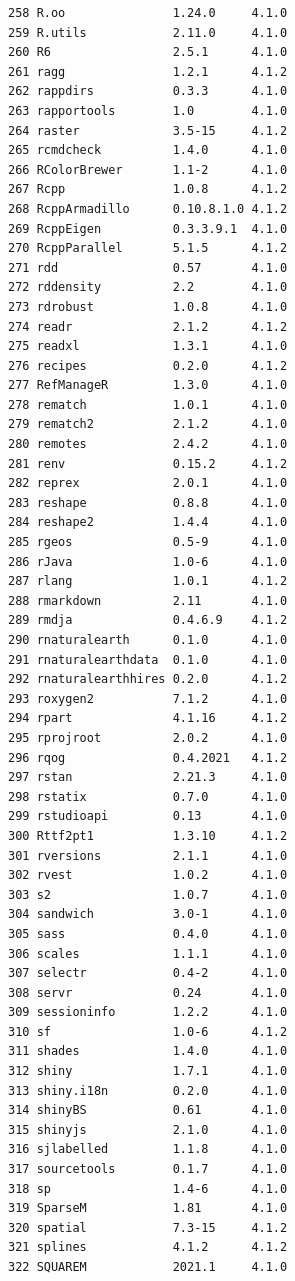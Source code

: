 \documentclass[
  a4paper,
  pandoc,
  ja=standard,
  jafont=haranoaji]{bxjsbook}
\begin{document}
\begin{verbatim}
258 R.oo               1.24.0     4.1.0
259 R.utils            2.11.0     4.1.0
260 R6                 2.5.1      4.1.0
261 ragg               1.2.1      4.1.2
262 rappdirs           0.3.3      4.1.0
263 rapportools        1.0        4.1.0
264 raster             3.5-15     4.1.2
265 rcmdcheck          1.4.0      4.1.0
266 RColorBrewer       1.1-2      4.1.0
267 Rcpp               1.0.8      4.1.2
268 RcppArmadillo      0.10.8.1.0 4.1.2
269 RcppEigen          0.3.3.9.1  4.1.0
270 RcppParallel       5.1.5      4.1.2
271 rdd                0.57       4.1.0
272 rddensity          2.2        4.1.0
273 rdrobust           1.0.8      4.1.0
274 readr              2.1.2      4.1.2
275 readxl             1.3.1      4.1.0
276 recipes            0.2.0      4.1.2
277 RefManageR         1.3.0      4.1.0
278 rematch            1.0.1      4.1.0
279 rematch2           2.1.2      4.1.0
280 remotes            2.4.2      4.1.0
281 renv               0.15.2     4.1.2
282 reprex             2.0.1      4.1.0
283 reshape            0.8.8      4.1.0
284 reshape2           1.4.4      4.1.0
285 rgeos              0.5-9      4.1.0
286 rJava              1.0-6      4.1.0
287 rlang              1.0.1      4.1.2
288 rmarkdown          2.11       4.1.0
289 rmdja              0.4.6.9    4.1.2
290 rnaturalearth      0.1.0      4.1.0
291 rnaturalearthdata  0.1.0      4.1.0
292 rnaturalearthhires 0.2.0      4.1.2
293 roxygen2           7.1.2      4.1.0
294 rpart              4.1.16     4.1.2
295 rprojroot          2.0.2      4.1.0
296 rqog               0.4.2021   4.1.2
297 rstan              2.21.3     4.1.0
298 rstatix            0.7.0      4.1.0
299 rstudioapi         0.13       4.1.0
300 Rttf2pt1           1.3.10     4.1.2
301 rversions          2.1.1      4.1.0
302 rvest              1.0.2      4.1.0
303 s2                 1.0.7      4.1.0
304 sandwich           3.0-1      4.1.0
305 sass               0.4.0      4.1.0
306 scales             1.1.1      4.1.0
307 selectr            0.4-2      4.1.0
308 servr              0.24       4.1.0
309 sessioninfo        1.2.2      4.1.0
310 sf                 1.0-6      4.1.2
311 shades             1.4.0      4.1.0
312 shiny              1.7.1      4.1.0
313 shiny.i18n         0.2.0      4.1.0
314 shinyBS            0.61       4.1.0
315 shinyjs            2.1.0      4.1.0
316 sjlabelled         1.1.8      4.1.0
317 sourcetools        0.1.7      4.1.0
318 sp                 1.4-6      4.1.0
319 SparseM            1.81       4.1.0
320 spatial            7.3-15     4.1.2
321 splines            4.1.2      4.1.2
322 SQUAREM            2021.1     4.1.0

\end{verbatim}
\end{document}
